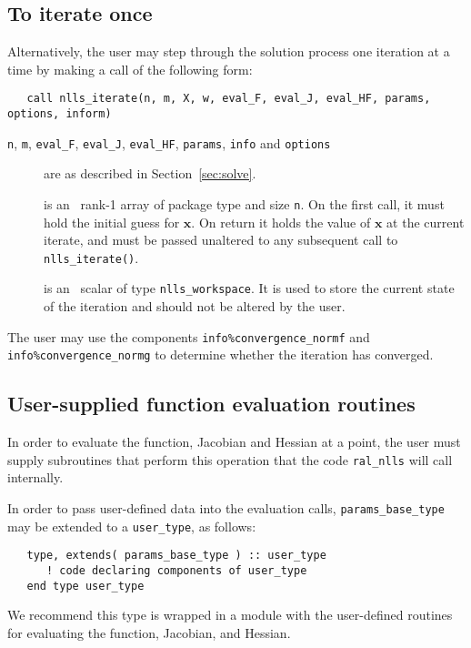 \documentclass{spec}
\begin{document}
\subsection{To iterate once}
\label{sec:iterate}
Alternatively, the user may step through the solution process one iteration at
a time by making a call of the following form:

\begin{verbatim}
   call nlls_iterate(n, m, X, w, eval_F, eval_J, eval_HF, params, options, inform)
\end{verbatim}

\begin{description}

\item[\texttt{n}, \texttt{m}, \texttt{eval\_F}, \texttt{eval\_J}, \texttt{eval\_HF}, \texttt{params}, \texttt{info} and \texttt{options}] are as described in Section~\ref{sec:solve}.

 is an \intentinout\  rank-1 array of package type
and size {\tt n}.  On the first call, it must hold the initial guess for
$\bm x$. On return it holds the value of $\bm x$ at the current iterate, and
must be passed unaltered to any subsequent call to \texttt{nlls\_iterate()}.

 is an \intentinout\ scalar of type \texttt{nlls\_workspace}. It is used
to store the current state of the iteration and should not be altered by the
user.

\end{description}

The user may use the components \texttt{info\%convergence\_normf} and
\texttt{info\%convergence\_normg} to determine whether the iteration has
converged.

\subsection{User-supplied function evaluation routines}
\label{sec::function_eval}
In order to evaluate the function, Jacobian and Hessian at a point, the user
must supply subroutines that perform this operation that the code
{\tt ral\_nlls} will call internally.

In order to pass user-defined data into the evaluation calls, {\tt params\_base\_type} may be extended to a {\tt user\_type}, as follows:
\begin{verbatim}
   type, extends( params_base_type ) :: user_type
      ! code declaring components of user_type
   end type user_type
\end{verbatim}
We recommend this type is wrapped in a module with the user-defined routines
for evaluating the function, Jacobian, and Hessian.
\end{document}
